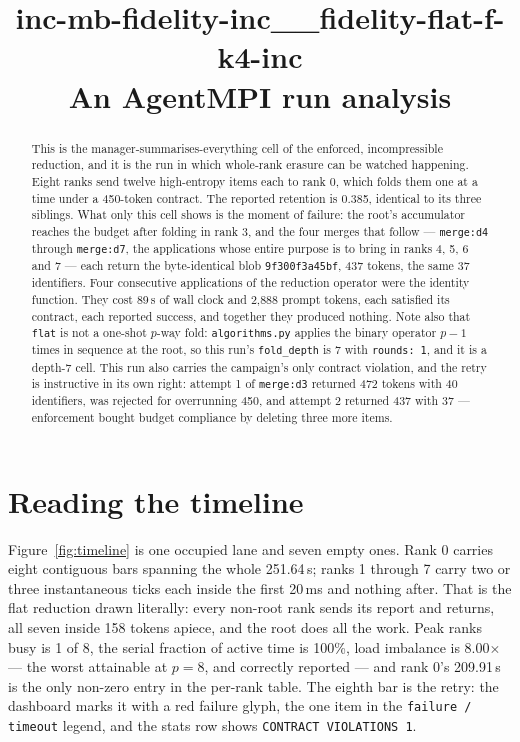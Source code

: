 \documentclass[11pt]{article}
\title{\textbf{inc-mb-fidelity-inc\_\_fidelity-flat-f-k4-inc}\\[2pt]\large An AgentMPI run analysis}
\author{}
\date{}
\begin{document}
\maketitle

\begin{abstract}
This is the manager-summarises-everything cell of the enforced, incompressible reduction,
and it is the run in which whole-rank erasure can be watched happening. Eight ranks send
twelve high-entropy items each to rank 0, which folds them one at a time under a 450-token
contract. The reported retention is 0.385, identical to its three siblings. What only this
cell shows is the moment of failure: the root's accumulator reaches the budget after
folding in rank 3, and the four merges that follow --- \texttt{merge:d4} through
\texttt{merge:d7}, the applications whose entire purpose is to bring in ranks 4, 5, 6 and
7 --- each return the byte-identical blob \texttt{9f300f3a45bf}, 437 tokens, the same 37
identifiers. Four consecutive applications of the reduction operator were the identity
function. They cost 89\,s of wall clock and 2{,}888 prompt tokens, each satisfied its
contract, each reported success, and together they produced nothing. Note also that
\texttt{flat} is not a one-shot $p$-way fold: \texttt{algorithms.py} applies the binary
operator $p-1$ times in sequence at the root, so this run's \texttt{fold\_depth} is 7 with
\texttt{rounds: 1}, and it is a depth-7 cell. This run also carries the campaign's only
contract violation, and the retry is instructive in its own right: attempt 1 of
\texttt{merge:d3} returned 472 tokens with 40 identifiers, was rejected for overrunning
450, and attempt 2 returned 437 with 37 --- enforcement bought budget compliance by
deleting three more items.
\end{abstract}



\section{Reading the timeline}

Figure~\ref{fig:timeline} is one occupied lane and seven empty ones. Rank 0 carries eight
contiguous bars spanning the whole 251.64\,s; ranks 1 through 7 carry two or three
instantaneous ticks each inside the first 20\,ms and nothing after. That is the flat
reduction drawn literally: every non-root rank sends its report and returns, all seven
inside 158 tokens apiece, and the root does all the work. Peak ranks busy is 1 of 8, the
serial fraction of active time is 100\%, load imbalance is 8.00$\times$ --- the worst
attainable at $p=8$, and correctly reported --- and rank 0's 209.91\,s is the only
non-zero entry in the per-rank table. The eighth bar is the retry: the dashboard marks it
with a red failure glyph, the one item in the \texttt{failure / timeout} legend, and the
stats row shows \texttt{CONTRACT VIOLATIONS 1}.
\end{document}

